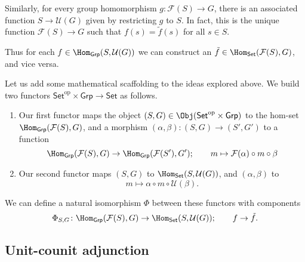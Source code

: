 \documentclass[notes.tex]{subfiles}
\begin{document}
Similarly, for every group homomorphism $g\colon \mathcal{F}(S) \to G$, there is an associated function $S \to \mathcal{U}(G)$ given by restricting $g$ to $S$. In fact, this is the unique function $\mathcal{F}(S) \to G$ such that $f(s) = \tilde{f}(s)$ for all $s \in S$.

Thus for each $f \in \Hom_{\mathsf{Grp}}(S, \mathcal{U}(G))$ we can construct an $\tilde{f} \in \Hom_{\mathsf{Set}}(\mathcal{F}(S), G)$, and vice versa.

Let us add some mathematical scaffolding to the ideas explored above. We build two functors $\mathsf{Set}^{\mathrm{op}} \times \mathsf{Grp} \rightarrow \mathsf{Set}$ as follows.
\begin{enumerate}
  \item Our first functor maps the object $(S, G) \in \Obj(\mathsf{Set}^{\mathrm{op}} \times \mathsf{Grp})$ to the hom-set $\Hom_{\mathsf{Grp}}(\mathcal{F}(S), G)$, and a morphism $(\alpha, \beta)\colon (S,G) \to (S', G')$ to a function
    \begin{equation*}
      \Hom_{\mathsf{Grp}}(\mathcal{F}(S), G) \to \Hom_{\mathsf{Grp}}(\mathcal{F}(S'), G');\qquad m \mapsto \mathcal{F}(\alpha) \circ m \circ \beta
    \end{equation*}

  \item Our second functor maps $(S, G)$ to $\Hom_{\mathsf{Set}}(S, \mathcal{U}(G))$, and $(\alpha, \beta)$ to
    \begin{equation*}
      m \mapsto \alpha \circ m \circ \mathcal{U}(\beta).
    \end{equation*}
\end{enumerate}
We can define a natural isomorphism $\Phi$ between these functors with components
\begin{equation*}
  \Phi_{S, G}\colon \Hom_{\mathsf{Grp}}(\mathcal{F}(S), G) \to \Hom_{\mathsf{Set}}(S, \mathcal{U}(G));\qquad f \to \tilde{f}.
\end{equation*}

\subsection{Unit-counit adjunction}
\label{ssc:unit_counit_adjunction}
\end{document}
